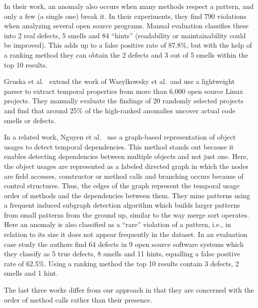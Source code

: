 In their work, an anomaly also occurs when many methods respect a pattern, and only a few (a single one) break it.
In their experiments, they find 790 violations when analyzing several open source programs.
Manual evaluation classifies these into 2 real defects, 5 smells and 84 ``hints'' (readability or maintainability could be improved).
This adds up to a false positive rate of 87.8\%, but with the help of a ranking method they can obtain the 2 defects and 3 out of 5 smells within the top 10 results.

Gruska et al.~\cite{gruska2010learning} extend the work of Wasylkowsky et al.\ and use a lightweight parser to extract temporal properties from more than 6,000 open source Linux projects.
They manually evaluate the findings of 20 randomly selected projects and find that around 25\% of the high-ranked anomalies uncover actual code smells or defects.

In a related work, Nguyen et al.~\cite{nguyen2009graph} use a graph-based representation of object usages to detect temporal dependencies.
This method stands out because it enables detecting dependencies between multiple objects and not just one.
Here, the object usages are represented as a labeled directed graph in which the nodes are field accesses, constructor or method calls and branching occurs because of control structures.
Thus, the edges of the graph represent the temporal usage order of methods and the dependencies between them.
They mine patterns using a frequent induced subgraph detection algorithm which builds larger patterns from small patterns from the ground up, similar to the way merge sort operates.
Here an anomaly is also classified as a ``rare'' violation of a pattern, i.e., in relation to its size it does not appear frequently in the dataset.
In an evaluation case study the authors find 64 defects in 9 open source software systems which they classify as 5 true defects, 8 smells and 11 hints, equalling a false positive rate of 62.5\%.
Using a ranking method the top 10 results contain 3 defects, 2 smells and 1 hint.

The last three works differ from our approach in that they are concerned with the order of method calls rather than their presence.

